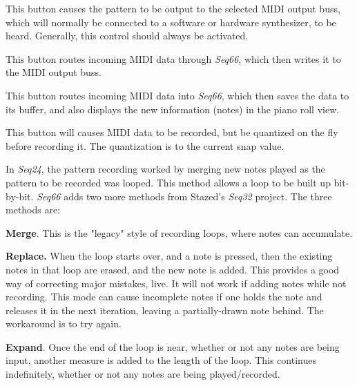    This button causes the pattern to be output to the
   selected MIDI output buss,
   which will normally be connected to a software or hardware
   synthesizer, to be heard.
   Generally, this control should always be activated.

   This button routes incoming MIDI data through
   \textsl{Seq66}, which then writes it to the MIDI output buss.

   This button routes incoming MIDI data into
   \textsl{Seq66}, which then saves the data to its buffer, and also
   displays the new information (notes) in the piano roll view.

   This button will causes MIDI data to be recorded, but be
   quantized on the fly before recording it.
   The quantization is to the current snap value.

   In \textsl{Seq24}, the pattern recording worked by merging new notes played
   as the pattern to be recorded was looped.  This method allows a loop to be
   built up bit-by-bit.  \textsl{Seq66} adds two more methods from
   Stazed's \textsl{Seq32} project.  The three methods are:

   \begin{enumber}
      \item \textbf{Merge}. 
         This is the "legacy" style of recording loops, where notes can
         accumulate.
      \item \textbf{Replace.}
         When the loop starts over, and a note is pressed,
         then the existing notes in that loop are erased,
         and the new note is added.
         This provides a good way of correcting major mistakes, live.
         It will not work if adding notes while not recording.
         This mode can cause incomplete notes if one
         holds the note and releases it in the next iteration, leaving a
         partially-drawn note behind.  The workaround is to try again.
      \item \textbf{Expand}.
         Once the end of the loop is near, whether or
         not any notes are being input, another measure is added to the length of
         the loop.  This continues indefinitely, whether or not any notes are
         being played/recorded.
   \end{enumber}

